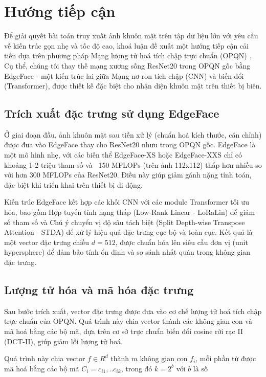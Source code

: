 \section{Hướng tiếp cận}
Để giải quyết bài toán truy xuất ảnh khuôn mặt trên tập dữ liệu lớn với yêu cầu về kiến trúc gọn nhẹ và tốc độ cao, khoá luận đề xuất một hướng tiếp cận cải tiến dựa trên phương pháp Mạng lượng tử hoá tích chập trực chuẩn (OPQN) \cite{opqn}. Cụ thể, chúng tôi thay thế mạng xương sống ResNet20 trong OPQN gốc bằng EdgeFace - một kiến trúc lai giữa Mạng nơ-ron tích chập (CNN) và biến đổi (Transformer), được thiết kế đặc biệt cho nhận diện khuôn mặt trên thiết bị biên.

\subsection{Trích xuất đặc trưng sử dụng EdgeFace}
Ở giai đoạn đầu, ảnh khuôn mặt sau tiền xử lý (chuẩn hoá kích thước, căn chỉnh) được đưa vào EdgeFace thay cho ResNet20 nhưu trong OPQN gốc. EdgeFace là một mô hình nhẹ, với các biến thể EdgeFace-XS hoặc EdgeFace-XXS chỉ có khoảng 1-2 triệu tham số và ~150 MFLOPs (trên ảnh 112x112) thấp hơn nhiều so với hơn 300 MFLOPs của ResNet20. Điều này giúp giảm gánh nặng tính toán, đặc biệt khi triển khai trên thiết bị di động. 

Kiến trúc EdgeFace kết hợp các khối CNN với các module Transformer tối ưu hóa, bao gồm Hợp tuyến tính hạng thấp (Low-Rank Linear - LoRaLin) để giảm số tham số và Chú ý chuyển vị độ sâu tách biệt (Split Depth-wise Transpose Attention - STDA) để xử lý hiệu quả đặc trưng cục bộ và toàn cục. Kết quả là một vector đặc trưng chiều $ d = 512 $, được chuẩn hóa lên siêu cầu đơn vị (unit hypersphere) để đảm bảo tính ổn định và so sánh nhất quán trong không gian đặc trưng.

\subsection{Lượng tử hóa và mã hóa đặc trưng}
Sau bước trích xuất, vector đặc trưng được đưa vào cơ chế lượng tử hoá tích chập trực chuẩn của OPQN. Quá trình này chia vector thành các không gian con và mã hoá bằng các bộ mã, dựa trên cơ sở trực chuẩn biến đổi cosine rời rạc II (DCT-II), giúp giảm lỗi lượng tử hoá. 

Quá trình này chia vector $f \in R^d$ thành $m$ không gian con $f_i$, mỗi phần từ được mã hoá bằng các bộ mã $C_i = {c_{i1},..c_{ik}}$, trong đó $k = 2^b$ với $b$ là số 


